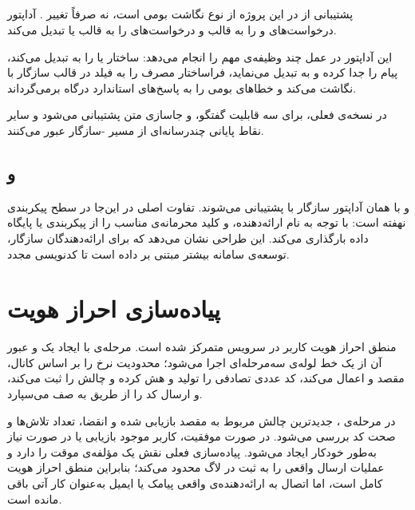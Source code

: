 \subsection{}

پشتیبانی از  در این پروژه از نوع نگاشت بومی است، نه صرفاً تغییر
. آداپتور  درخواست‌های
 و  را به قالب  و
درخواست‌های  را به قالب  یا
 تبدیل می‌کند.

این آداپتور در عمل چند وظیفه‌ی مهم را انجام می‌دهد: ساختار
 یا  را به  تبدیل می‌کند،
پیام  را جدا کرده و به  تبدیل می‌نماید،
فراساختار مصرف  را به فیلد  در قالب سازگار با
 نگاشت می‌کند و خطاهای بومی  را به پاسخ‌های
استاندارد درگاه برمی‌گرداند.

در نسخه‌ی فعلی،  برای سه قابلیت گفتگو،  و
جاسازی متن پشتیبانی می‌شود و سایر نقاط پایانی چندرسانه‌ای از مسیر
-سازگار عبور می‌کنند.

\subsection{ و }

 و  با همان آداپتور سازگار با 
پشتیبانی می‌شوند. تفاوت اصلی در این‌جا در سطح پیکربندی نهفته است:
 با توجه به نام ارائه‌دهنده،  و کلید
محرمانه‌ی مناسب را از پیکربندی یا پایگاه داده بارگذاری می‌کند. این طراحی
نشان می‌دهد که برای ارائه‌دهندگان سازگار، توسعه‌ی سامانه بیشتر مبتنی بر
داده است تا کدنویسی مجدد.

\section{پیاده‌سازی احراز هویت }

منطق احراز هویت کاربر در سرویس  متمرکز شده است. مرحله‌ی
 با ایجاد یک  و عبور آن از یک
خط لوله‌ی سه‌مرحله‌ای اجرا می‌شود؛  محدودیت نرخ را
بر اساس کانال، مقصد و  اعمال می‌کند،  کد
عددی تصادفی را تولید و هش کرده و چالش را ثبت می‌کند، و
 ارسال کد را از طریق  به صف
می‌سپارد.

در مرحله‌ی ، جدیدترین چالش مربوط به مقصد بازیابی شده و
انقضا، تعداد تلاش‌ها و صحت کد بررسی می‌شود. در صورت موفقیت، کاربر موجود
بازیابی یا در صورت نیاز به‌طور خودکار ایجاد می‌شود. پیاده‌سازی فعلی
 نقش یک مؤلفه‌ی موقت را دارد و عملیات ارسال واقعی را به ثبت در
لاگ محدود می‌کند؛ بنابراین منطق احراز هویت کامل است، اما اتصال به
ارائه‌دهنده‌ی واقعی پیامک یا ایمیل به‌عنوان کار آتی باقی مانده است.

